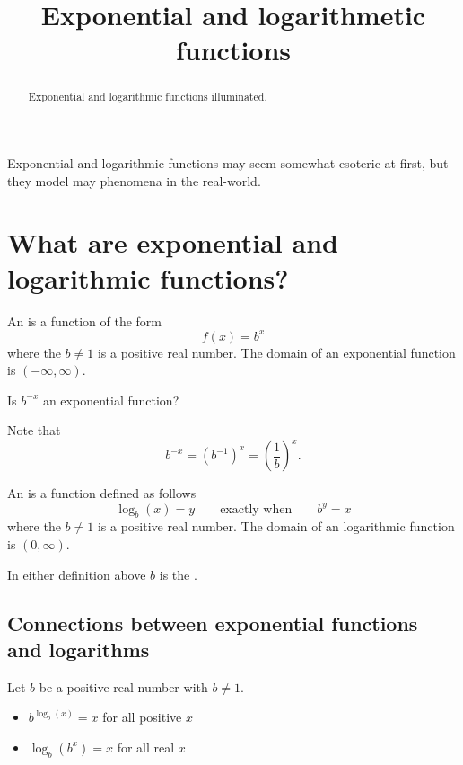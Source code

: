 \documentclass{ximera}
\title[Dig-In:]{Exponential and logarithmetic functions}
\begin{document}
\begin{abstract}
  Exponential and logarithmic functions illuminated.
\end{abstract}
\maketitle

Exponential and logarithmic functions may seem somewhat esoteric at
first, but they model may phenomena in the real-world.




\section{What are exponential and logarithmic functions?}


\begin{definition}
  An  is a function of the form
  \[
  f(x) = b^x
  \]
  where the $b\ne 1$ is a positive real number. The domain of an
  exponential function is $(-\infty,\infty)$.
\end{definition}

\begin{question}
  Is $b^{-x}$ an exponential function?
  \begin{multipleChoice}
  \end{multipleChoice}
  \begin{feedback}
    Note that
    \[
    b^{-x} = \left(b^{-1}\right)^x = \left(\frac{1}{b}\right)^x.
    \]
  \end{feedback}
\end{question}



\begin{definition}
  An  is a function defined as follows
  \[
  \log_b(x) = y \qquad\text{exactly when}\qquad b^y = x
  \]
  where the $b\ne 1$ is a positive real number. The domain of an
  logarithmic function is $(0,\infty)$.
\end{definition}

In either definition above $b$ is the .

\subsection{Connections between exponential functions and logarithms}

Let $b$ be a positive real number with $b\ne 1$.
\begin{itemize}
\item $b^{\log_b(x)} = x$ for all positive $x$
\item $\log_b(b^x) = x$ for all real $x$
\end{itemize}
\end{document}
